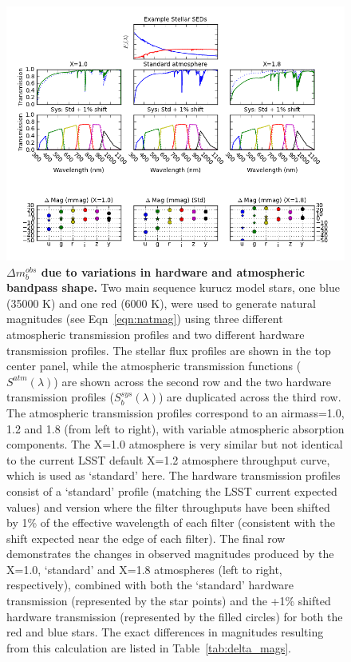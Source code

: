 \documentclass[12pt,preprint]{aastex}
\begin{document}
\begin{figure}[htbp]
\includegraphics[width=6in]{delta_mags}
\caption{ {\small {\bf $\Delta m_b^{obs}$ due to variations in
hardware and atmospheric bandpass shape.} Two main sequence kurucz model
stars, one blue (35000 K) and one red (6000 K), were used to generate
natural magnitudes (see 
Eqn~\ref{eqn:natmag}) using three different atmospheric transmission
profiles and two different hardware transmission profiles. The stellar
flux profiles are shown in the top center panel, while the atmospheric
transmission functions ($S^{atm}(\lambda)$) are shown across the
second row and the two hardware transmission profiles
($S_b^{sys}(\lambda)$) are duplicated across the third row. The
atmospheric transmission profiles correspond to an airmass=1.0, 1.2
and 1.8 (from left to right), with variable atmospheric absorption
components. The X=1.0 atmosphere is very similar but not
identical to the current LSST default X=1.2 atmosphere throughput
curve, which is used as `standard' here. The hardware transmission
profiles consist of a `standard' profile (matching the LSST current
expected values) and version where the filter throughputs have been
shifted by 1\% of the effective wavelength of each filter (consistent
with the shift expected near the edge of each filter). The final row
demonstrates the changes in observed magnitudes produced by the X=1.0,
`standard' and X=1.8 atmospheres (left to right, respectively),
combined with both the `standard' hardware transmission (represented by
the star points) and the +1\% shifted hardware transmission (represented
by the filled circles) for both the red and blue stars. The exact
differences in magnitudes resulting from this calculation are listed in
Table~\ref{tab:delta_mags}. }
\label{fig:delta_mags} }
\end{figure}
\end{document}
